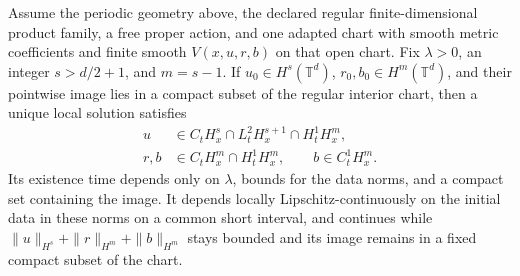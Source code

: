Assume the periodic geometry above, the declared regular finite-dimensional product family, a free proper action, and one adapted chart with smooth metric coefficients and finite smooth $V(x,u,r,b)$ on that open chart. Fix $\lambda>0$, an integer $s>d/2+1$, and $m=s-1$. If $u_0\in H^s(\mathbb T^d)$, $r_0,b_0\in H^m(\mathbb T^d)$, and their pointwise image lies in a compact subset of the regular interior chart, then a unique local solution satisfies
\begin{equation}
 \begin{aligned}
 u&\in C_tH^s_x\cap L^2_tH^{s+1}_x\cap H^1_tH^m_x,\\
 r,b&\in C_tH^m_x\cap H^1_tH^m_x,\qquad b\in C^1_tH^m_x.
 \end{aligned}
 \label{comp:ctx:solution-class}
\end{equation}
Its existence time depends only on $\lambda$, bounds for the data norms, and a compact set containing the image. It depends locally Lipschitz-continuously on the initial data in these norms on a common short interval, and continues while $\|u\|_{H^s}+\|r\|_{H^m}+\|b\|_{H^m}$ stays bounded and its image remains in a fixed compact subset of the chart.

